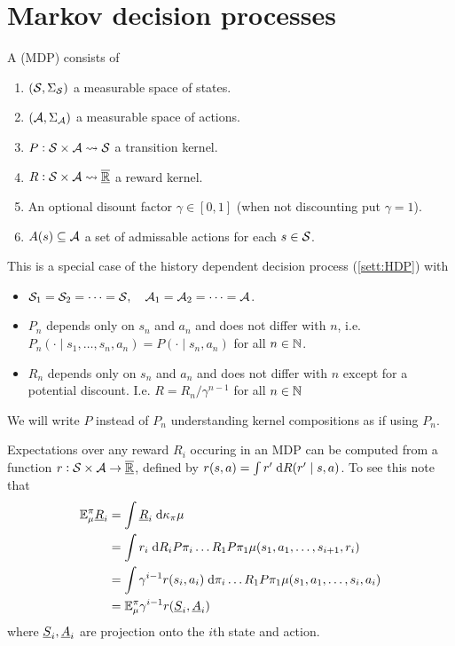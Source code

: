 \section{Markov decision processes}

\begin{defn}
  A  (MDP) consists of
  \begin{enumerate}
    \item $(\mathcal{S}, \Sigma_{\mathcal{S}})$ a 
      measurable space of states.
    \item $(\mathcal{A}, \Sigma_{\mathcal{A}})$ a 
      measurable space of actions.
    \item $P : \mathcal{S} \times \mathcal{A} \leadsto \mathcal{S}$
      a transition kernel.
    \item $R : \mathcal{S} \times \mathcal{A} \leadsto \overline{\underline{\mathbb{R}}}$
      a reward kernel.
    \item An optional disount factor $\gamma \in [0,1]$
      (when not discounting put $\gamma = 1$).
    \item $A(s) \subseteq \mathcal{A}$ a set of admissable actions
      for each $s \in \mathcal{S}$.
  \end{enumerate}
  \label{sett:MDP}
\end{defn}
This is a special case of the
history dependent decision process (\cref{sett:HDP}) with
\begin{itemize}
  \item 
    $\mathcal{S}_1 = \mathcal{S}_2 = \dots = \mathcal{S},
    \quad \mathcal{A}_1 = \mathcal{A}_2 = \dots = \mathcal{A}$.
  \item $P_n$ depends only on $s_n$ and $a_n$ and does not
    differ with $n$, i.e. 
    $P_n(\cdot \mid s_1, \dots, s_n, a_n) = P(\cdot \mid s_n, a_n)$
    for all $n \in \mathbb{N}$.
  \item $R_n$ depends only on $s_n$ and $a_n$ and does not differ
    with $n$ except for a potential discount.
    I.e. $R = R_n/\gamma^{n-1}$ for all $n \in \mathbb{N}$
\end{itemize}
We will write $P$ instead of $P_n$ understanding
kernel compositions as if using $P_n$.
\begin{rem}
 Expectations over any reward $R_i$ occuring in an MDP
 can be computed from a function $r: \mathcal{S} \times \mathcal{A} \to \overline{\underline{\mathbb{R}}}$,
 defined by $r(s, a) = \int r' \; \mathrm{d} R(r' \mid s, a)$.
 To see this note that
 \begin{align*}
   \mathbb{E}_\mu^\pi \underline{R}_i &= \int \underline{R}_i \; \mathrm{d} \kappa_\pi \mu
   \\ &= \int r_i \; \mathrm{d} R_i P \pi_i \dots R_1 P \pi_1 \mu
   (s_1, a_1, \dots, s_{i+1}, r_i)
   \\ &= \int \gamma^{i-1} r(s_i, a_i) \; \mathrm{d} \pi_i \dots R_1 P \pi_1 \mu
   (s_1, a_1, \dots, s_i, a_i)
   \\ &= \mathbb{E}_\mu^\pi \gamma^{i-1} r(\underline{S}_i, \underline{A}_i)
 \end{align*}
 where $\underline{S}_i, \underline{A}_i$ are projection onto the $i$th state and action.
\end{rem}
